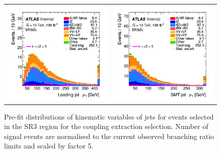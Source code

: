 \begin{figure}[htbp]
\begin{tabular}{cc}
		\includegraphics[width=.45\textwidth]{Chapters/CH5/figures/SR3_UsingSMT/jet_pt} &
		\includegraphics[width=.45\textwidth]{Chapters/CH5/figures/SR3_UsingSMT/SMTjet_Pt} \\
	\end{tabular}
	\caption{Pre-fit distributions of kinematic variables of jets for events selected in the SR3 region for the \tZc coupling extraction selection. Number of signal events are normalised to the current observed branching ratio limits and scaled by factor 5. 
		\ErrStatOnly
		\Blinded
	}%
	\label{fig:sr3_kin_jet}
\end{figure}
\newpage
